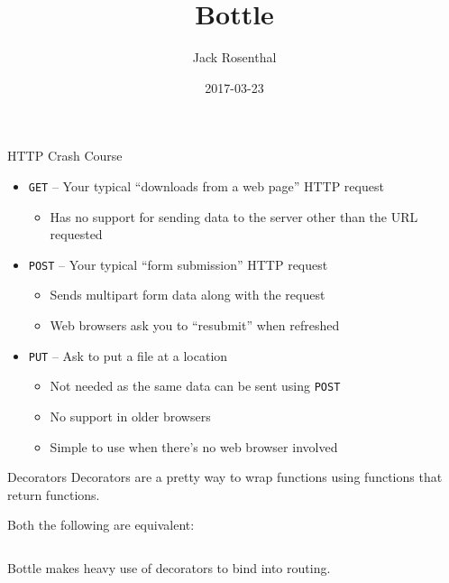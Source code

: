 \documentclass{lug}
\title{Bottle}
\author{Jack Rosenthal}
\date{2017-03-23}
\institute{Mines Linux Users Group}
\begin{document}
\begin{frame}{HTTP Crash Course}
    \begin{itemize}[<+->]
        \item \texttt{GET} -- Your typical ``downloads from a web page'' HTTP
            request
            \begin{itemize}
                \item Has no support for sending data to the server other than
                    the URL requested
            \end{itemize}
        \item \texttt{POST} -- Your typical ``form submission'' HTTP request
            \begin{itemize}
                \item Sends multipart form data along with the request
                \item Web browsers ask you to ``resubmit'' when refreshed
            \end{itemize}
        \item \texttt{PUT} -- Ask to put a file at a location
            \begin{itemize}
                \item Not needed as the same data can be sent using
                    \texttt{POST}
                \item No support in older browsers
                \item Simple to use when there's no web browser involved
            \end{itemize}
    \end{itemize}
\end{frame}

\begin{frame}{Decorators}
    Decorators are a pretty way to wrap functions using functions that return
    functions.

    \pause

    Both the following are equivalent:
    \inputminted{python3}{examples/decorator_equiv.py}

    Bottle makes heavy use of decorators to bind into routing.
\end{frame}
\end{document}
